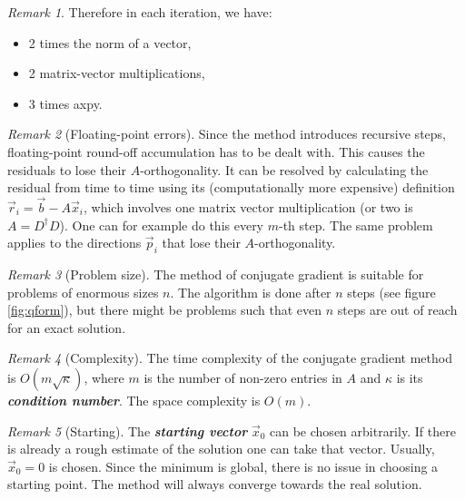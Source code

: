 \documentclass{article}
\theoremstyle{plain} %
\theoremstyle{convention} %
\theoremstyle{remark} %
\newtheorem*{remark}{Remark} %
\def\df#1{\textbf{\textit{#1}}}
\numberwithin{equation}{section}
\begin{document}
\begin{remark}
    Therefore in each iteration, we have:
    \begin{itemize}
        \item 2 times the norm of a vector,
        \item 2 matrix-vector multiplications,
        \item 3 times axpy.\footnotemark
    \end{itemize}
\end{remark}


\begin{remark}[Floating-point errors]
    Since the method introduces recursive steps, floating-point round-off accumulation has to be dealt with. This causes the residuals to lose their $A$-orthogonality. It can be resolved by calculating the residual from time to time using its (computationally more expensive) definition $\vec{r}_i = \vec{b} - A \vec{x}_i$, which involves one matrix vector multiplication (or two is $A=D^{\dagger}D$). One can for example do this every $m$-th step. The same problem applies to the directions $\vec{p}_i$ that lose their $A$-orthogonality.
\end{remark}

\begin{remark}[Problem size]
    The method of conjugate gradient is suitable for problems of enormous sizes $n$. The algorithm is done after $n$ steps (see figure \ref{fig:qform}), but there might be problems such that even $n$ steps are out of reach for an exact solution.
\end{remark}

\begin{remark}[Complexity]
    The time complexity of the conjugate gradient method is $O(m \sqrt{\kappa})$, where $m$ is the number of non-zero entries in $A$ and $\kappa$ is its \df{condition number}. The space complexity is $O(m)$.
\end{remark}

\begin{remark}[Starting]
    The \df{starting vector} $\vec{x}_0$ can be chosen arbitrarily. If there is already a rough estimate of the solution one can take that vector. Usually, $\vec{x}_0 = 0$ is chosen. Since the minimum is global, there is no issue in choosing a starting point. The method will always converge towards the real solution.
\end{remark}
\end{document}
